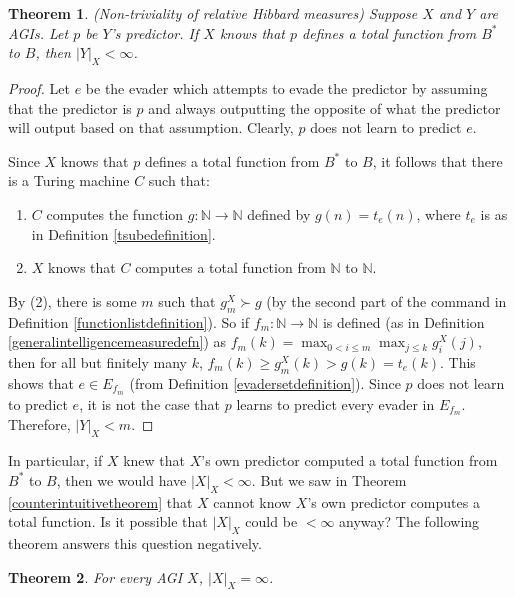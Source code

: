 \documentclass{article}
\newtheorem{theorem}{Theorem}
\begin{document}
\begin{theorem}
\label{simplehibbardnontrivialtheorem}
    (Non-triviality of relative Hibbard measures)
    Suppose $X$ and $Y$ are AGIs. Let $p$ be $Y$'s predictor.
    If $X$ knows that $p$ defines a total function from $B^*$ to $B$,
    then $|Y|_X<\infty$.
\end{theorem}

\begin{proof}
    Let $e$ be the evader which attempts to evade the predictor by assuming
    that the predictor is $p$ and always outputting the opposite of what
    the predictor will output based on that assumption. Clearly, $p$ does
    not learn to predict $e$.

    Since $X$ knows that $p$ defines a total function from $B^*$ to $B$,
    it follows that there is a Turing machine $C$ such that:
    \begin{enumerate}
        \item
        $C$ computes the function $g:\mathbb N\to \mathbb N$ defined by
        $g(n)=t_e(n)$, where $t_e$ is as in Definition \ref{tsubedefinition}.
        \item
        $X$ knows that $C$ computes a total function from $\mathbb N$ to $\mathbb N$.
    \end{enumerate}
    By (2), there is some $m$ such that $g^X_m\succ g$
    (by the second part of the command in Definition \ref{functionlistdefinition}).
    So if $f_m:\mathbb N\to\mathbb N$ is defined
    (as in Definition \ref{generalintelligencemeasuredefn})
    as $f_m(k)=\max_{0<i\leq m}\max_{j\leq k}g^X_i(j)$,
    then for all but finitely many $k$, $f_m(k)\geq g^X_m(k)>g(k)=t_e(k)$.
    This shows that $e\in E_{f_m}$ (from Definition \ref{evadersetdefinition}).
    Since $p$ does not learn to predict $e$,
    it is not the case that $p$ learns to predict every evader in $E_{f_m}$.
    Therefore, $|Y|_X<m$.
\end{proof}

In particular, if $X$ knew that $X$'s own predictor computed a total function
from $B^*$ to $B$, then we would have $|X|_X<\infty$.
But we saw in Theorem \ref{counterintuitivetheorem} that $X$ cannot know
$X$'s own predictor computes a total function. Is it possible that $|X|_X$ could
be $<\infty$ anyway? The following theorem answers this question negatively.

\begin{theorem}
\label{Xjudgesitselfinfinitelysmarttheorem}
    For every AGI $X$, $|X|_X=\infty$.
\end{theorem}
\end{document}
